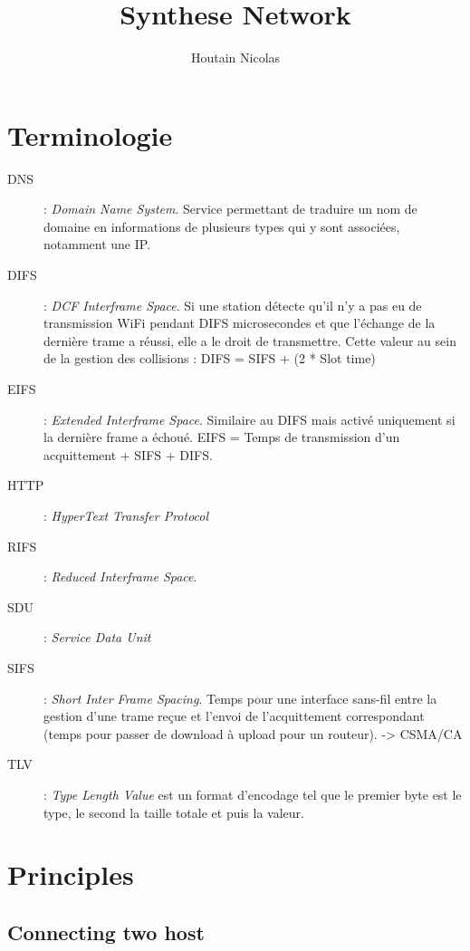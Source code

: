 \documentclass{report}
\begin{document}
\author{Houtain Nicolas}
\title{Synthese Network}

\maketitle
\tableofcontents

\chapter{Terminologie}

\begin{description}
    \item[DNS] : \textit{Domain Name System}. Service permettant de traduire un nom de domaine en informations de plusieurs types qui y sont associées, notamment une IP.
    \item[DIFS] : \textit{DCF Interframe Space}. Si une station détecte qu'il n'y a pas eu de transmission WiFi pendant DIFS microsecondes et que l'échange de la dernière trame a réussi, elle a le droit de transmettre. Cette valeur au sein de la gestion des collisions : DIFS = SIFS + (2 * Slot time)
    \item[EIFS] : \textit{Extended Interframe Space}. Similaire au DIFS mais activé uniquement si la dernière frame a échoué. EIFS = Temps de transmission d'un acquittement + SIFS + DIFS.
    \item[HTTP] : \textit{HyperText Transfer Protocol}
    \item[RIFS] : \textit{Reduced Interframe Space}. 
    \item[SDU] : \textit{Service Data Unit}
    \item[SIFS] : \textit{Short Inter Frame Spacing}. Temps pour une interface sans-fil entre la gestion d'une trame reçue et l'envoi de l'acquittement correspondant (temps pour passer de download à upload pour un routeur).  -> CSMA/CA
    \item[TLV] : \textit{Type Length Value} est un format d'encodage tel que le premier byte est le type, le second la taille totale et puis la valeur.
\end{description}


\chapter{Principles}

\section{Connecting two host}
\end{document}
